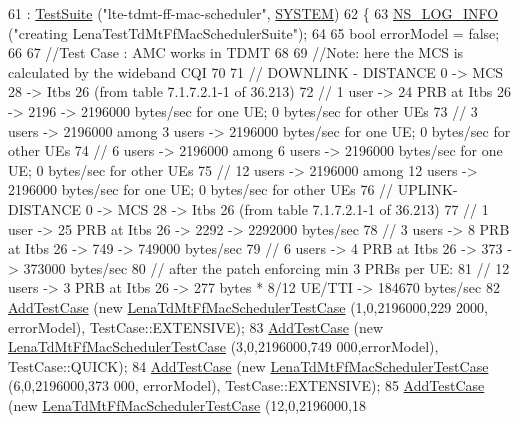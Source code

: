 \begin{DoxyCode}
61   : \hyperlink{classns3_1_1TestSuite_a904b0c40583b744d30908aeb94636d1a}{TestSuite} (\textcolor{stringliteral}{"lte-tdmt-ff-mac-scheduler"}, \hyperlink{classns3_1_1TestSuite_a1ebfcab34ec8161e085e8e3a1855eae0a90c5529a26ab3a5ffcc6e57040dbd82e}{SYSTEM})
62 \{
63   \hyperlink{group__logging_gafbd73ee2cf9f26b319f49086d8e860fb}{NS\_LOG\_INFO} (\textcolor{stringliteral}{"creating LenaTestTdMtFfMacSchedulerSuite"});
64 
65   \textcolor{keywordtype}{bool} errorModel = \textcolor{keyword}{false};
66 
67   \textcolor{comment}{//Test Case : AMC works in TDMT}
68 
69   \textcolor{comment}{//Note: here the MCS is calculated by the wideband CQI}
70 
71   \textcolor{comment}{// DOWNLINK - DISTANCE 0 -> MCS 28 -> Itbs 26 (from table 7.1.7.2.1-1 of 36.213)}
72   \textcolor{comment}{// 1 user -> 24 PRB at Itbs 26 -> 2196 -> 2196000 bytes/sec for one UE; 0 bytes/sec for other UEs}
73   \textcolor{comment}{// 3 users -> 2196000 among 3 users -> 2196000 bytes/sec for one UE; 0 bytes/sec for other UEs}
74   \textcolor{comment}{// 6 users -> 2196000 among 6 users -> 2196000 bytes/sec for one UE; 0 bytes/sec for other UEs}
75   \textcolor{comment}{// 12 users -> 2196000 among 12 users -> 2196000 bytes/sec for one UE; 0 bytes/sec for other UEs}
76   \textcolor{comment}{// UPLINK- DISTANCE 0 -> MCS 28 -> Itbs 26 (from table 7.1.7.2.1-1 of 36.213)}
77   \textcolor{comment}{// 1 user -> 25 PRB at Itbs 26 -> 2292 -> 2292000 bytes/sec}
78   \textcolor{comment}{// 3 users -> 8 PRB at Itbs 26 -> 749 -> 749000 bytes/sec}
79   \textcolor{comment}{// 6 users -> 4 PRB at Itbs 26 -> 373 -> 373000 bytes/sec}
80   \textcolor{comment}{// after the patch enforcing min 3 PRBs per UE:}
81   \textcolor{comment}{// 12 users -> 3 PRB at Itbs 26 -> 277 bytes * 8/12 UE/TTI -> 184670 bytes/sec}
82   \hyperlink{classns3_1_1TestCase_a3718088e3eefd5d6454569d2e0ddd835}{AddTestCase} (\textcolor{keyword}{new} \hyperlink{classLenaTdMtFfMacSchedulerTestCase}{LenaTdMtFfMacSchedulerTestCase} (1,0,2196000,229
      2000, errorModel), TestCase::EXTENSIVE);
83   \hyperlink{classns3_1_1TestCase_a3718088e3eefd5d6454569d2e0ddd835}{AddTestCase} (\textcolor{keyword}{new} \hyperlink{classLenaTdMtFfMacSchedulerTestCase}{LenaTdMtFfMacSchedulerTestCase} (3,0,2196000,749
      000,errorModel), TestCase::QUICK);
84   \hyperlink{classns3_1_1TestCase_a3718088e3eefd5d6454569d2e0ddd835}{AddTestCase} (\textcolor{keyword}{new} \hyperlink{classLenaTdMtFfMacSchedulerTestCase}{LenaTdMtFfMacSchedulerTestCase} (6,0,2196000,373
      000, errorModel), TestCase::EXTENSIVE);
85   \hyperlink{classns3_1_1TestCase_a3718088e3eefd5d6454569d2e0ddd835}{AddTestCase} (\textcolor{keyword}{new} \hyperlink{classLenaTdMtFfMacSchedulerTestCase}{LenaTdMtFfMacSchedulerTestCase} (12,0,2196000,18

\end{DoxyCode}
